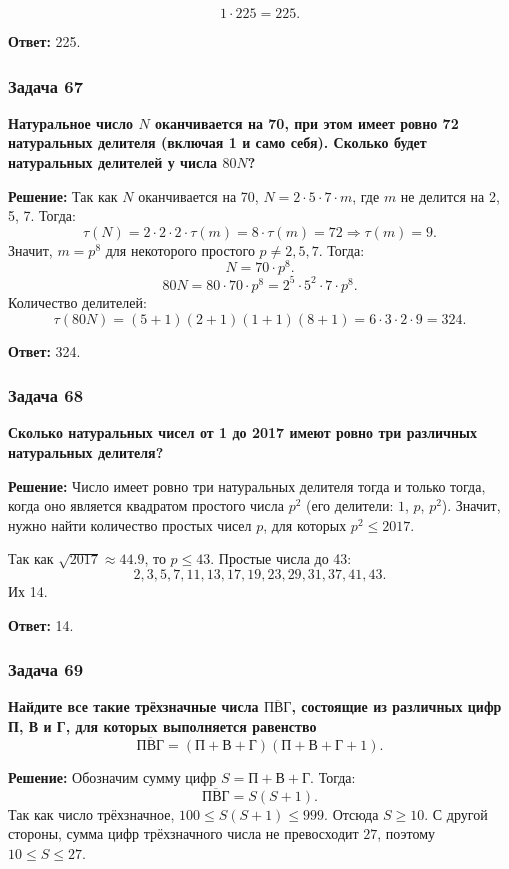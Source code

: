 \documentclass[12pt, a4paper]{article}
\begin{document}
\[
1 \cdot 225 = 225.
\]

\textbf{Ответ:} 225.

\subsubsection*{Задача 67}
\textbf{Натуральное число $N$ оканчивается на 70, при этом имеет ровно 72 натуральных делителя (включая 1 и само себя). Сколько будет натуральных делителей у числа $80N$?}

\textbf{Решение:}
Так как $N$ оканчивается на 70, $N = 2 \cdot 5 \cdot 7 \cdot m$, где $m$ не делится на 2, 5, 7. Тогда:
\[
\tau(N) = 2 \cdot 2 \cdot 2 \cdot \tau(m) = 8 \cdot \tau(m) = 72 \Rightarrow \tau(m) = 9.
\]
Значит, $m = p^8$ для некоторого простого $p \neq 2, 5, 7$. Тогда:
\[
N = 70 \cdot p^8.
\]
\[
80N = 80 \cdot 70 \cdot p^8 = 2^5 \cdot 5^2 \cdot 7 \cdot p^8.
\]
Количество делителей:
\[
\tau(80N) = (5+1)(2+1)(1+1)(8+1) = 6 \cdot 3 \cdot 2 \cdot 9 = 324.
\]

\textbf{Ответ:} 324.

\subsubsection*{Задача 68}
\textbf{Сколько натуральных чисел от 1 до 2017 имеют ровно три различных натуральных делителя?}

\textbf{Решение:}
Число имеет ровно три натуральных делителя тогда и только тогда, когда оно является квадратом простого числа $p^2$ (его делители: $1$, $p$, $p^2$). Значит, нужно найти количество простых чисел $p$, для которых $p^2 \le 2017$.

Так как $\sqrt{2017} \approx 44.9$, то $p \le 43$. Простые числа до 43:
\[
2, 3, 5, 7, 11, 13, 17, 19, 23, 29, 31, 37, 41, 43.
\]
Их 14.

\textbf{Ответ:} 14.

\subsubsection*{Задача 69}
\textbf{Найдите все такие трёхзначные числа $\overline{\text{ПВГ}}$, состоящие из различных цифр П, В и Г, для которых выполняется равенство}
\[
\overline{\text{ПВГ}} = (\text{П} + \text{В} + \text{Г})(\text{П} + \text{В} + \text{Г} + 1).
\]

\textbf{Решение:}
Обозначим сумму цифр $S = \text{П} + \text{В} + \text{Г}$. Тогда:
\[
\overline{\text{ПВГ}} = S(S+1).
\]
Так как число трёхзначное, $100 \le S(S+1) \le 999$. Отсюда $S \ge 10$. С другой стороны, сумма цифр трёхзначного числа не превосходит $27$, поэтому $10 \le S \le 27$.
\end{document}
